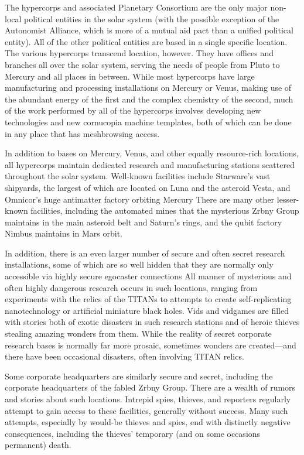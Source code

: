 The hypercorps and associated Planetary Consortium 
are the only major non-local political entities in the 
solar system (with the possible exception of the Autonomist
Alliance, which is more of a mutual aid pact
than a unified political entity). All of the other political
entities are based in a single specific location. The
various hypercorps transcend location, however. They 
have offices and branches all over the solar system, 
serving the needs of people from Pluto to Mercury 
and all places in between. While most hypercorps 
have large manufacturing and processing installations 
on Mercury or Venus, making use of the abundant 
energy of the first and the complex chemistry of the 
second, much of the work performed by all of the 
hypercorps involves developing new technologies and 
new cornucopia machine templates, both of which can 
be done in any place that has meshbrowsing access.

In addition to bases on Mercury, Venus, and other 
equally resource-rich locations, all hypercorps maintain
dedicated research and manufacturing stations
scattered throughout the solar system. Well-known 
facilities include Starware's vast shipyards, the largest 
of which are located on Luna and the asteroid Vesta, 
and Omnicor's huge antimatter factory orbiting Mercury
There are many other lesser-known facilities,
including the automated mines that the mysterious 
Zrbny Group maintains in the main asteroid belt and 
Saturn's rings, and the qubit factory Nimbus maintains
in Mars orbit.

In addition, there is an even larger number of 
secure and often secret research installations, some 
of which are so well hidden that they are normally 
only accessible via highly secure egocaster connections
All manner of mysterious and often highly
dangerous research occurs in such locations, ranging 
from experiments with the relics of the TITANs to 
attempts to create self-replicating nanotechnology or 
artificial miniature black holes. Vids and vidgames 
are filled with stories both of exotic disasters in 
such research stations and of heroic thieves stealing
amazing wonders from them. While the reality
of secret corporate research bases is normally far 
more prosaic, sometimes wonders are created—and 
there have been occasional disasters, often involving 
TITAN relics.

Some corporate headquarters are similarly secure 
and secret, including the corporate headquarters 
of the fabled Zrbny Group. There are a wealth of 
rumors and stories about such locations. Intrepid 
spies, thieves, and reporters regularly attempt to gain 
access to these facilities, generally without success. 
Many such attempts, especially by would-be thieves 
and spies, end with distinctly negative consequences, 
including the thieves' temporary (and on some occasions
permanent) death.

